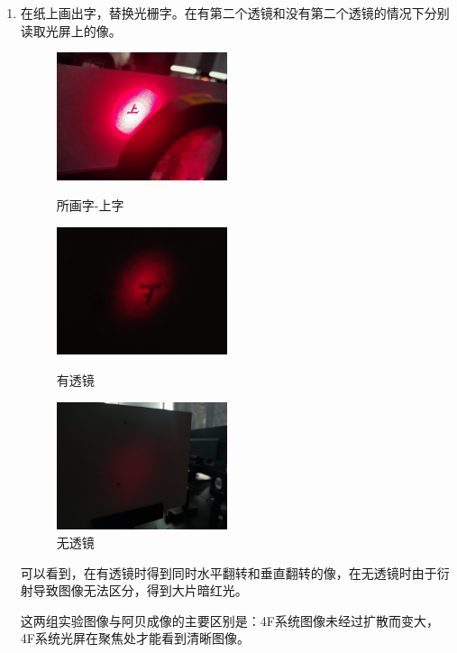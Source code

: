 \documentclass[11pt]{article}
\begin{document}
\begin{enumerate}
    \item 在纸上画出字，替换光栅字。在有第二个透镜和没有第二个透镜的情况下分别读取光屏上的像。
    \begin{figure}[H]
        \centering
        \begin{minipage}[t]{0.33\linewidth}
            \centering
            \includegraphics[width=5cm]{Fig/11-上字.jpg}
            \caption{所画字-上字}
        \end{minipage}
        \begin{minipage}[t]{0.33\linewidth}
            \centering
            \includegraphics[width=5cm]{Fig/11-有透镜.jpg}
            \caption{有透镜}
        \end{minipage}
        \begin{minipage}[t]{0.33\linewidth}
            \centering
            \includegraphics[width=5cm]{Fig/11-无透镜.jpg}
            \caption{无透镜}
        \end{minipage}
    \end{figure}
    \par \hspace*{2em} 可以看到，在有透镜时得到同时水平翻转和垂直翻转的像，在无透镜时由于衍射导致图像无法区分，得到大片暗红光。
    \par \hspace*{2em}这两组实验图像与阿贝成像的主要区别是：4F系统图像未经过扩散而变大，4F系统光屏在聚焦处才能看到清晰图像。
\end{enumerate}
\end{document}
